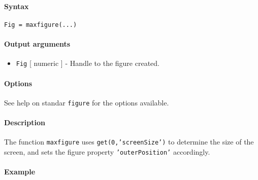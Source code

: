 


	\paragraph{Syntax}

\begin{verbatim}
Fig = maxfigure(...)
\end{verbatim}

\paragraph{Output arguments}

\begin{itemize}
\itemsep1pt\parskip0pt
\item
  \texttt{Fig} {[} numeric {]} - Handle to the figure created.
\end{itemize}

\paragraph{Options}

See help on standar \texttt{figure} for the options available.

\paragraph{Description}

The function \texttt{maxfigure} uses \texttt{get(0,'screenSize')} to
determine the size of the screen, and sets the figure property
\texttt{'outerPosition'} accordingly.

\paragraph{Example}


